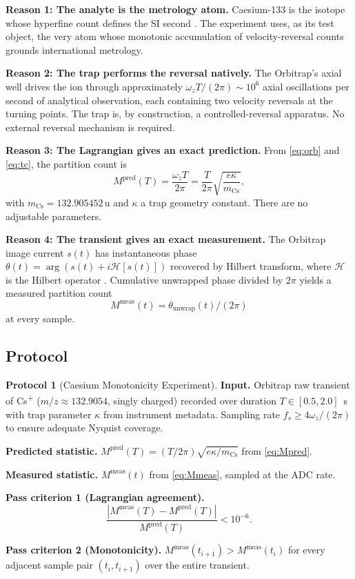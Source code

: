 \documentclass[twocolumn,10pt,a4paper]{article}
\theoremstyle{thmstyle}
\theoremstyle{definition}
\newtheorem{protocol}[theorem]{Protocol}
\theoremstyle{remark}
\begin{document}
\textbf{Reason 1: The analyte is the metrology atom.} Caesium-133 is
the isotope whose hyperfine count defines the SI second
\citep{si2019}. The experiment uses, as its test object, the very
atom whose monotonic accumulation of velocity-reversal counts grounds
international metrology.

\textbf{Reason 2: The trap performs the reversal natively.} The
Orbitrap's axial well drives the ion through approximately
$\omega_{z}T/(2\pi)\sim 10^{6}$ axial oscillations per second of
analytical observation, each containing two velocity reversals at the
turning points. The trap is, by construction, a controlled-reversal
apparatus. No external reversal mechanism is required.

\textbf{Reason 3: The Lagrangian gives an exact prediction.} From
\eqref{eq:orb} and \eqref{eq:tc}, the partition count is
\begin{equation}
M^{\mathrm{pred}}(T)=\frac{\omega_{z}T}{2\pi}=\frac{T}{2\pi}\sqrt{\frac{e\kappa}{m_{\mathrm{Cs}}}},
\label{eq:Mpred}
\end{equation}
with $m_{\mathrm{Cs}}=132.905452\,\mathrm{u}$ \citep{atomicmasses2020}
and $\kappa$ a trap geometry constant. There are no adjustable
parameters.

\textbf{Reason 4: The transient gives an exact measurement.} The
Orbitrap image current $s(t)$ has instantaneous phase
$\theta(t)=\arg(s(t)+i\mathcal{H}[s(t)])$ recovered by Hilbert
transform, where $\mathcal{H}$ is the Hilbert operator \citep{gabor1946}.
Cumulative unwrapped phase divided by $2\pi$ yields a measured
partition count
\begin{equation}
M^{\mathrm{meas}}(t)=\theta_{\mathrm{unwrap}}(t)/(2\pi)
\label{eq:Mmeas}
\end{equation}
at every sample.

\subsection{Protocol}

\begin{protocol}[Caesium Monotonicity Experiment]
\label{prot:C1}
\textbf{Input.} Orbitrap raw transient of Cs\textsuperscript{+}
($m/z\approx 132.9054$, singly charged) recorded over duration
$T\in[0.5,2.0]$~s with trap parameter $\kappa$ from instrument
metadata. Sampling rate $f_{s}\geq 4\omega_{z}/(2\pi)$ to ensure
adequate Nyquist coverage.

\textbf{Predicted statistic.}
$M^{\mathrm{pred}}(T)=(T/2\pi)\sqrt{e\kappa/m_{\mathrm{Cs}}}$ from
\eqref{eq:Mpred}.

\textbf{Measured statistic.} $M^{\mathrm{meas}}(t)$ from
\eqref{eq:Mmeas}, sampled at the ADC rate.

\textbf{Pass criterion 1 (Lagrangian agreement).}
\[
\frac{|M^{\mathrm{meas}}(T)-M^{\mathrm{pred}}(T)|}{M^{\mathrm{pred}}(T)}<10^{-6}.
\]

\textbf{Pass criterion 2 (Monotonicity).}
$M^{\mathrm{meas}}(t_{i+1})>M^{\mathrm{meas}}(t_{i})$ for every
adjacent sample pair $(t_{i},t_{i+1})$ over the entire transient.
\end{protocol}
\end{document}
